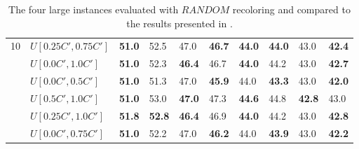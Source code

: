 \begin{table}[h]
{\begin{tabular}{|l|l||l|l||l|l||l|l||l|l|}
      \hline\hline
      \multirow{6}{*}{10}
       & $U[0.25C',0.75C']$ & \textbf{51.0} & 52.5 		& 47.0 & \textbf{46.7} 		& \textbf{44.0} & \textbf{44.0} 		& 43.0 & \textbf{42.4}\\
       & $U[0.0C',1.0C']$ & \textbf{51.0} & 52.3 			& \textbf{46.4} & 46.7 		& \textbf{44.0} & 44.2 		& 43.0 & \textbf{42.7}\\
       & $U[0.0C',0.5C']$ & \textbf{51.0} & 51.3 			& 47.0 & \textbf{45.9} 		& 44.0 & \textbf{43.3} 		& 43.0 & \textbf{42.0}\\
       & $U[0.5C',1.0C']$ & \textbf{51.0} & 53.0 			& \textbf{47.0} & 47.3 		& \textbf{44.6} & 44.8 		& \textbf{42.8} & 43.0\\
       & $U[0.25C',1.0C']$ & \textbf{51.8} & \textbf{52.8} & \textbf{46.4} & 46.9 	& \textbf{44.0} & 44.2 		& 43.0 & \textbf{42.8}\\
       & $U[0.0C',0.75C']$ & \textbf{51.0} & 52.2 			& 47.0 & \textbf{46.2} 		& 44.0 & \textbf{43.9} 		& 43.0 & \textbf{42.2}\\
      \hline
      \end{tabular}
      }
      \caption{The four large instances evaluated with $RANDOM$ recoloring and compared to the results presented in \cite{noronha-06}.}
      \label{tab:inCompared}\end{table}
